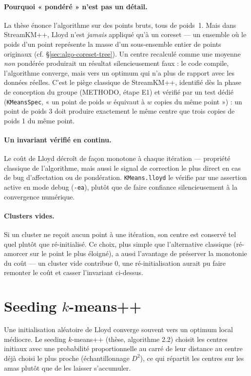 \paragraph{Pourquoi « pondéré » n'est pas un détail.}
La thèse énonce l'algorithme sur des points bruts, tous de poids~1. Mais dans
StreamKM++, Lloyd n'est \emph{jamais} appliqué qu'à un coreset --- un ensemble
où le poids d'un point représente la masse d'un sous-ensemble entier de
points originaux (cf. §\ref{sec:algo-coreset-tree}). Un centre recalculé
comme une moyenne \emph{non} pondérée produirait un résultat silencieusement
faux : le code compile, l'algorithme converge, mais vers un optimum qui
n'a plus de rapport avec les données réelles. C'est le piège classique de
StreamKM++, identifié dès la phase de conception du groupe (METHODO, étape
E1) et vérifié par un test dédié (\texttt{KMeansSpec}, « un point de poids
$w$ équivaut à $w$ copies du même point ») : un point de poids 3 doit
produire exactement le même centre que trois copies de poids 1 du même point.

\paragraph{Un invariant vérifié en continu.}
Le coût de Lloyd décroît de façon monotone à chaque itération --- propriété
classique de l'algorithme, mais aussi le signal de correction le plus direct
en cas de bug d'affectation ou de pondération. \texttt{KMeans.lloyd} le
vérifie par une assertion active en mode debug (\texttt{-ea}), plutôt que de
faire confiance silencieusement à la convergence numérique.

\paragraph{Clusters vides.} Si un cluster ne reçoit aucun point à une
itération, son centre est conservé tel quel plutôt que ré-initialisé. Ce
choix, plus simple que l'alternative classique (ré-amorcer sur le point le
plus éloigné), a aussi l'avantage de préserver la monotonie du coût --- un
cluster vide contribue 0, une ré-initialisation aurait pu faire remonter le
coût et casser l'invariant ci-dessus.

\section{Seeding \texorpdfstring{$k$}{k}-means++}
\label{sec:algo-kmeanspp}

Une initialisation aléatoire de Lloyd converge souvent vers un optimum local
médiocre. Le seeding $k$-means++ (thèse, algorithme 2.2) choisit les centres
initiaux avec une probabilité proportionnelle au carré de leur distance au
centre déjà choisi le plus proche (échantillonnage $D^2$), ce qui répartit
les centres sur les amas plutôt que de les laisser s'accumuler.


